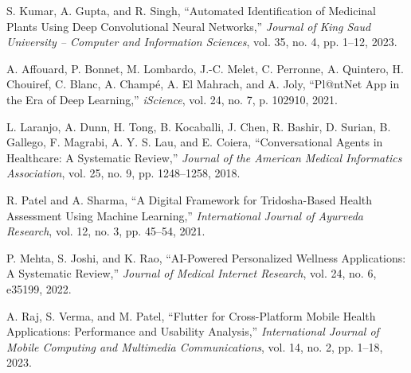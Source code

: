 \begin{enumerate}[leftmargin=*, label={[\arabic*]}]
    \item S. Kumar, A. Gupta, and R. Singh, ``Automated Identification of Medicinal
    Plants Using Deep Convolutional Neural Networks,'' \textit{Journal of King Saud
    University -- Computer and Information Sciences}, vol. 35, no. 4, pp. 1--12, 2023.

    \item A. Affouard, P. Bonnet, M. Lombardo, J.-C. Melet, C. Perronne, A. Quintero,
    H. Chouiref, C. Blanc, A. Champ{\'e}, A. El Mahrach, and A. Joly, ``Pl@ntNet App
    in the Era of Deep Learning,'' \textit{iScience}, vol. 24, no. 7, p. 102910, 2021.

    \item L. Laranjo, A. Dunn, H. Tong, B. Kocaballi, J. Chen, R. Bashir,
    D. Surian, B. Gallego, F. Magrabi, A. Y. S. Lau, and E. Coiera,
    ``Conversational Agents in Healthcare: A Systematic Review,''
    \textit{Journal of the American Medical Informatics Association},
    vol. 25, no. 9, pp. 1248--1258, 2018.

    \item R. Patel and A. Sharma, ``A Digital Framework for Tridosha-Based Health
    Assessment Using Machine Learning,'' \textit{International Journal of Ayurveda
    Research}, vol. 12, no. 3, pp. 45--54, 2021.

    \item P. Mehta, S. Joshi, and K. Rao, ``AI-Powered Personalized Wellness
    Applications: A Systematic Review,'' \textit{Journal of Medical Internet Research},
    vol. 24, no. 6, e35199, 2022.

    \item A. Raj, S. Verma, and M. Patel, ``Flutter for Cross-Platform Mobile Health
    Applications: Performance and Usability Analysis,'' \textit{International Journal
    of Mobile Computing and Multimedia Communications}, vol. 14, no. 2, pp. 1--18, 2023.
\end{enumerate}
